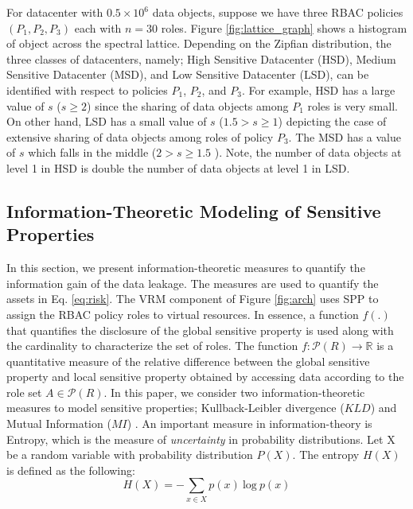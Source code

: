 
\begin{ex}
\label{ex:sensitivity}
For datacenter with $0.5 \times 10^6$ data objects, suppose we have three RBAC policies $(P_1,P_2,P_3)$ each with $n=30$ roles. Figure \ref{fig:lattice_graph} shows a histogram of object across the spectral lattice. Depending on the Zipfian distribution, the three classes of datacenters, namely; High Sensitive Datacenter (HSD), Medium Sensitive Datacenter (MSD), and Low Sensitive Datacenter (LSD), can be identified with respect to policies $P_1$, $P_2$, and $P_3$. For example, HSD has a large value of $s$  ($s \ge 2$) since the sharing of data objects among $P_1$ roles is very small. On other hand, LSD has a small value of $s$  ($1.5 > s \ge 1$) depicting the case of extensive sharing of data objects among roles of policy $P_3$. The MSD has a value of $s$ which falls in the  middle  ($2 > s \ge1.5$ ). Note, the number of data objects at level 1 in HSD is double the number of data objects at level 1 in LSD. 
\end{ex}  



\subsection{Information-Theoretic Modeling of Sensitive Properties}
\label{sec:SP}

In this section, we present information-theoretic measures to quantify the information gain of the data leakage. The measures are used to quantify the assets in Eq. \ref{eq:risk}. The VRM component of Figure \ref{fig:arch} uses SPP to assign the RBAC policy roles to virtual resources. In essence, a function $f(.)$ that quantifies the disclosure of the global sensitive property is used along with the cardinality to characterize the set of roles. The function $f: \mathcal{P}(R) \rightarrow \mathbb{R}$ is a quantitative measure of the relative difference between the global sensitive property and local sensitive property obtained by accessing data according to the role set $A \in \mathcal{P}(R)$. In this paper, we consider two information-theoretic measures to model sensitive properties; Kullback-Leibler divergence ($KLD$) and Mutual Information ($MI$)  \cite{cover2012elements}. An important measure in information-theory is Entropy, which is the measure of \textit{uncertainty} in probability distributions. Let X be a random variable with probability distribution $P(X)$. The entropy $H(X)$ is defined as the following:
\begin{equation*}
H(X) = - \underset{x \in X}{\sum} p(x) \ \text{log} \ p(x)
\end{equation*}
 

